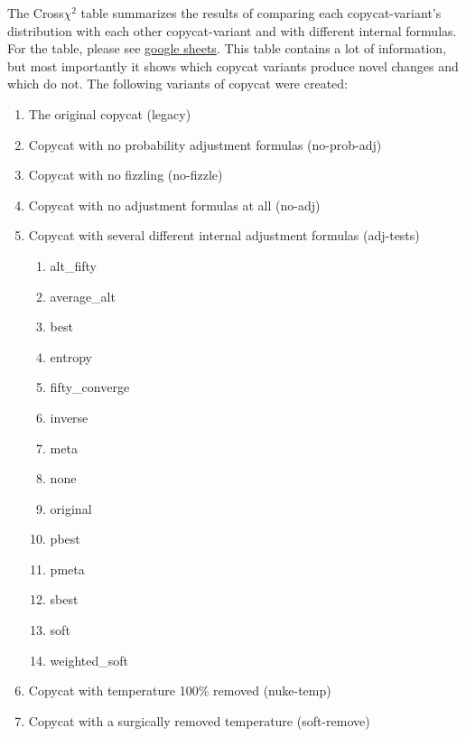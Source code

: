 \documentclass[a4paper]{article}
\begin{document}
        The Cross$\chi^2$ table summarizes the results of comparing each copycat-variant's distribution with each other copycat-variant and with different internal formulas.
        For the table, please see \href{"https://docs.google.com/spreadsheets/d/1d4EyEbWLJpLYlE7qSPPb8e1SqCAZUvtqVCd0Ns88E-8/edit?usp=sharing"}{google sheets}.
        This table contains a lot of information, but most importantly it shows which copycat variants produce novel changes and which do not.
        The following variants of copycat were created:
        \begin{enumerate}
            \item The original copycat (legacy)
            \item Copycat with no probability adjustment formulas (no-prob-adj)
            \item Copycat with no fizzling (no-fizzle)
            \item Copycat with no adjustment formulas at all (no-adj)
            \item Copycat with several different internal adjustment formulas (adj-tests)
                \begin{enumerate}
                    \item alt\_fifty
                    \item average\_alt
                    \item best
                    \item entropy
                    \item fifty\_converge
                    \item inverse
                    \item meta
                    \item none
                    \item original
                    \item pbest
                    \item pmeta
                    \item sbest
                    \item soft
                    \item weighted\_soft
                \end{enumerate}
            \item Copycat with temperature 100\% removed (nuke-temp)
            \item Copycat with a surgically removed temperature (soft-remove)
        \end{enumerate}
\end{document}

